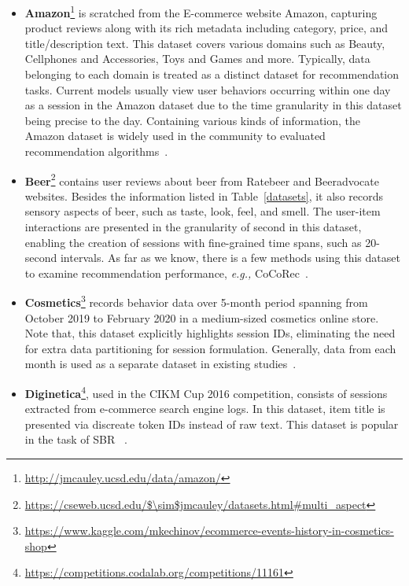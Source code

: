 \documentclass[lettersize,journal]{IEEEtran}
\newcommand{\eg}{\emph{e.g.,}\xspace}
\begin{document}
\begin{itemize}
    
    \item \textbf{Amazon}\footnote{\url{http://jmcauley.ucsd.edu/data/amazon/}} is scratched from the E-commerce website Amazon, capturing product reviews along with its rich metadata including category, price, and title/description text. This dataset covers various domains such as Beauty, Cellphones and Accessories, Toys and Games and more. Typically, data belonging to each domain is treated as a distinct dataset for recommendation tasks. Current models usually view user behaviors occurring within one day as a session in the Amazon dataset due to the time granularity in this dataset being precise to the day. Containing various kinds of information, the Amazon dataset is widely used in the community to evaluated recommendation algorithms~\cite{Bian@CIKM2023, Wu@ICDE2023, CoHHN, BiPNet, MMSBR}.
    
    \item \textbf{Beer}\footnote{\url{https://cseweb.ucsd.edu/$\sim$jmcauley/datasets.html\#multi\_aspect}} contains user reviews about beer from Ratebeer and Beeradvocate websites. Besides the information listed in Table~\ref{datasets}, it also records sensory aspects of beer, such as taste, look, feel, and smell. The user-item interactions are presented in the granularity of second in this dataset, enabling the creation of sessions with fine-grained time spans, such as 20-second intervals. As far as we know, there is a few methods using this dataset to examine recommendation performance, \eg CoCoRec~\cite{cai@SIGIR2021}. 

    \item \textbf{Cosmetics}\footnote{\url{https://www.kaggle.com/mkechinov/ecommerce-events-history-in-cosmetics-shop}} records behavior data over 5-month period spanning from October 2019 to February 2020 in a medium-sized cosmetics online store. Note that, this dataset explicitly highlights session IDs, eliminating the need for extra data partitioning for session formulation. Generally, data from each month is used as a separate dataset in existing studies~\cite{CoHHN,Chen@SIGIR2023,Chen@CIKM2023Short}.

    \item \textbf{Diginetica}\footnote{\url{https://competitions.codalab.org/competitions/11161}}, used in the CIKM Cup 2016 competition, consists of sessions extracted from e-commerce search engine logs. In this dataset, item title is presented via discreate token IDs instead of raw text. This dataset is popular in the task of SBR ~\cite{DPAN4Rec,song@CIKM2021,lai@SIGIR2022,Liu@NeurIPS2023}.


\end{itemize}
\end{document}
